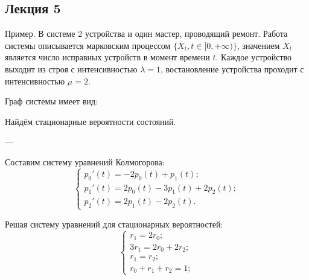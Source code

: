 \subsection{Лекция 5}

Пример. В системе 2 устройства и один мастер, проводящий ремонт.
Работа системы описывается марковским процессом $\{X_t, t\in [0, +\infty) \}$,
значением $X_t$ является число исправных устройств в момент времени $t$.
Каждое устройство выходит из строя с интенсивностью $\lambda=1$,
востановление устройства проходит с интенсивностью $\mu=2$.

Граф системы имеет вид:

\begin{center}
\end{center}

Найдём стационарные вероятности состояний.

---


Составим систему уравнений Колмогорова:
\[
	\begin{cases}
		p_0'(t) = -2p_0(t) + p_1(t);           \\
		p_1'(t) = 2p_0(t) - 3p_1(t) + 2p_2(t); \\
		p_2'(t) = 2p_1(t) - 2p_2(t).
	\end{cases}
\]

Решая систему уравнений для стационарных вероятностей:
\[
	\begin{cases}
		r_1 = 2r_0;         \\
		3r_1 = 2r_0 + 2r_2; \\
		r_1 = r_2;          \\
		r_0 + r_1 + r_2 = 1;
	\end{cases}
\]

